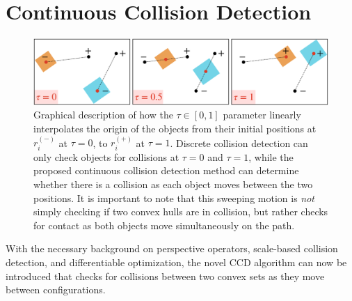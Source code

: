 \section{Continuous Collision Detection}\label{sec:cdcol:cdcol}
%
%
%
%
\begin{figure}[t!]
    \centering
    \includegraphics[width=.8\textwidth]{figures/tau/third.png}
    \caption{Graphical description of how the $\tau \in [0, 1]$ parameter linearly interpolates the origin of the objects from their initial positions at $r_i^{(-)}$ at $\tau = 0$, to $r_i^{(+)}$ at $\tau = 1$. Discrete collision detection can only check objects for collisions at $\tau = 0$ and $\tau = 1$, while the proposed continuous collision detection method can determine whether there is a collision as each object moves between the two positions. It is important to note that this sweeping motion is \textit{not} simply checking if two convex hulls are in collision, but rather checks for contact as both objects move simultaneously on the path.}
    \label{fig:sweep_tau}
\end{figure}
%
With the necessary background on perspective operators, scale-based collision detection, and differentiable optimization, the novel CCD algorithm can now be introduced that checks for collisions between two convex sets as they move between configurations. 

